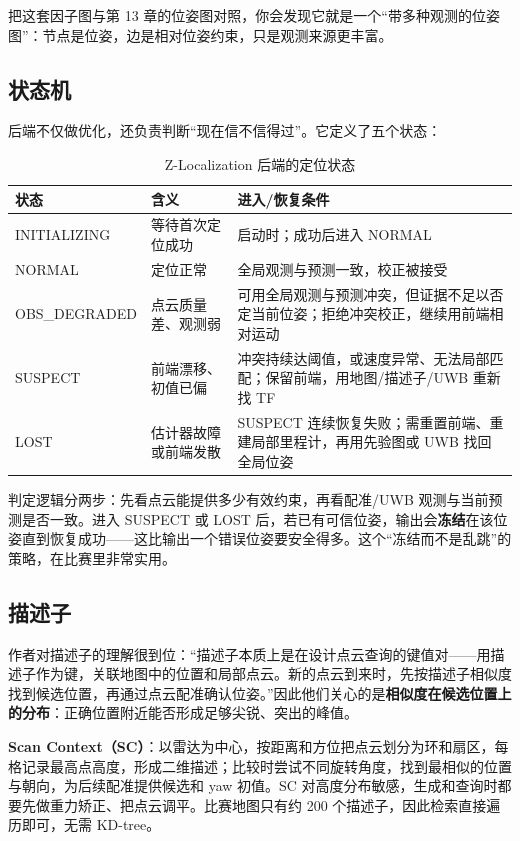把这套因子图与第 13 章的位姿图对照，你会发现它就是一个“带多种观测的位姿图”：节点是位姿，边是相对位姿约束，只是观测来源更丰富。

\subsection{状态机}

后端不仅做优化，还负责判断“现在信不信得过”。它定义了五个状态：

\begin{table}[htbp]
  \centering
  \caption{Z-Localization 后端的定位状态}\label{tab:23-states}
  \small
  \begin{tabular}{p{2.4cm}p{5.0cm}p{4.6cm}}
    \toprule
    状态 & 含义 & 进入/恢复条件 \\
    \midrule
    INITIALIZING & 等待首次定位成功 & 启动时；成功后进入 NORMAL \\
    NORMAL & 定位正常 & 全局观测与预测一致，校正被接受 \\
    OBS\_DEGRADED & 点云质量差、观测弱 & 可用全局观测与预测冲突，但证据不足以否定当前位姿；拒绝冲突校正，继续用前端相对运动 \\
    SUSPECT & 前端漂移、初值已偏 & 冲突持续达阈值，或速度异常、无法局部匹配；保留前端，用地图/描述子/UWB 重新找 TF \\
    LOST & 估计器故障或前端发散 & SUSPECT 连续恢复失败；需重置前端、重建局部里程计，再用先验图或 UWB 找回全局位姿 \\
    \bottomrule
  \end{tabular}
\end{table}

判定逻辑分两步：先看点云能提供多少有效约束，再看配准/UWB 观测与当前预测是否一致。进入 SUSPECT 或 LOST 后，若已有可信位姿，输出会\textbf{冻结}在该位姿直到恢复成功——这比输出一个错误位姿要安全得多。这个“冻结而不是乱跳”的策略，在比赛里非常实用。

\subsection{描述子}

作者对描述子的理解很到位：“描述子本质上是在设计点云查询的键值对——用描述子作为键，关联地图中的位置和局部点云。新的点云到来时，先按描述子相似度找到候选位置，再通过点云配准确认位姿。”因此他们关心的是\textbf{相似度在候选位置上的分布}：正确位置附近能否形成足够尖锐、突出的峰值。

\textbf{Scan Context（SC）}\cite{kim2018scancontext}：以雷达为中心，按距离和方位把点云划分为环和扇区，每格记录最高点高度，形成二维描述；比较时尝试不同旋转角度，找到最相似的位置与朝向，为后续配准提供候选和 yaw 初值。SC 对高度分布敏感，生成和查询时都要先做重力矫正、把点云调平。比赛地图只有约 200 个描述子，因此检索直接遍历即可，无需 KD-tree。

